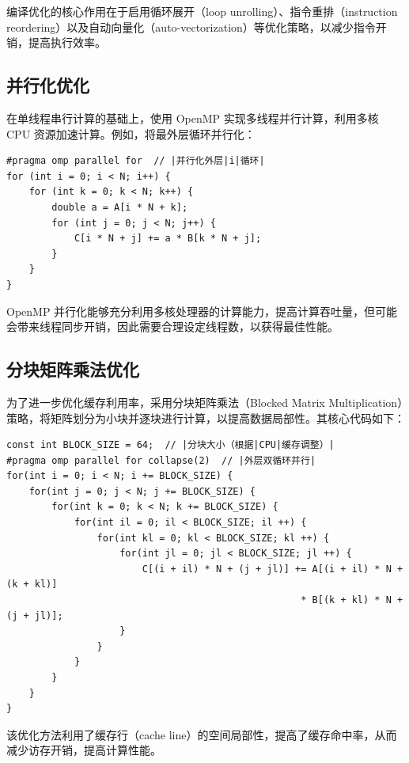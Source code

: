 \documentclass[a4paper, utf8]{ctexart}
\begin{document}
	编译优化的核心作用在于启用循环展开（loop unrolling）、指令重排（instruction reordering）以及自动向量化（auto-vectorization）等优化策略，以减少指令开销，提高执行效率。
	
	\subsection{并行化优化}
	
	在单线程串行计算的基础上，使用 OpenMP 实现多线程并行计算，利用多核 CPU 资源加速计算。例如，将最外层循环并行化：
	
	\begin{verbatim}
#pragma omp parallel for  // |并行化外层|i|循环|
for (int i = 0; i < N; i++) {
    for (int k = 0; k < N; k++) {
        double a = A[i * N + k];
        for (int j = 0; j < N; j++) {
            C[i * N + j] += a * B[k * N + j];
        }
    }
}
	\end{verbatim}
	
	OpenMP 并行化能够充分利用多核处理器的计算能力，提高计算吞吐量，但可能会带来线程同步开销，因此需要合理设定线程数，以获得最佳性能。
	
	\subsection{分块矩阵乘法优化}
	
	为了进一步优化缓存利用率，采用分块矩阵乘法（Blocked Matrix Multiplication）策略，将矩阵划分为小块并逐块进行计算，以提高数据局部性。其核心代码如下：
	
	\begin{verbatim}
const int BLOCK_SIZE = 64;  // |分块大小（根据|CPU|缓存调整）|
#pragma omp parallel for collapse(2)  // |外层双循环并行|
for(int i = 0; i < N; i += BLOCK_SIZE) {
    for(int j = 0; j < N; j += BLOCK_SIZE) {
        for(int k = 0; k < N; k += BLOCK_SIZE) {
            for(int il = 0; il < BLOCK_SIZE; il ++) {
                for(int kl = 0; kl < BLOCK_SIZE; kl ++) {
                    for(int jl = 0; jl < BLOCK_SIZE; jl ++) {
                        C[(i + il) * N + (j + jl)] += A[(i + il) * N + (k + kl)]
                                                    * B[(k + kl) * N + (j + jl)];
                    }
                }
            }
        }
    }
}
	\end{verbatim}
	
	该优化方法利用了缓存行（cache line）的空间局部性，提高了缓存命中率，从而减少访存开销，提高计算性能。
	
\end{document}
